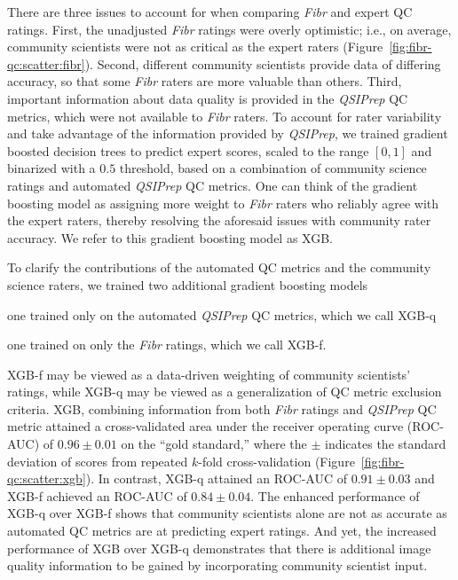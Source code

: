 \documentclass[9pt,lineno]{elife}
\begin{document}
There are three issues to account for when comparing \emph{Fibr} and expert QC ratings. First, the unadjusted \emph{Fibr} ratings were overly optimistic; i.e., on average,
community scientists were not as critical as the expert raters
(Figure~\ref{fig:fibr-qc:scatter:fibr}). Second, different community scientists
provide data of differing accuracy, so that some \emph{Fibr} raters are more valuable than others. Third, important information
about data quality is provided in the \emph{QSIPrep} QC metrics, which were not available to \emph{Fibr} raters. To account for rater
variability and take advantage of the information provided by \emph{QSIPrep},
we trained gradient boosted decision trees \citep{chen2016-eb} to predict expert scores, scaled to the range $[0, 1]$ and
binarized with a $0.5$ threshold,
based on a combination of community science ratings and automated \emph{QSIPrep}
QC metrics. One can think of the gradient boosting model as assigning more weight to \emph{Fibr} raters who reliably agree with the expert raters, thereby resolving the aforesaid issues with community rater accuracy. We refer to this gradient boosting model as XGB.

To clarify the contributions of the automated QC metrics and the community
science raters, we trained two additional gradient boosting models
\begin{enumerate*}[%
    label=(\roman*),%
    before=\unskip{: },%
    itemjoin={{, }},%
    itemjoin*={{ and }}]
    \item one trained only on the automated \emph{QSIPrep} QC metrics, which we
    call XGB-q
    \item one trained on only the \emph{Fibr} ratings, which we call XGB-f.
\end{enumerate*}
XGB-f may be viewed as a data-driven weighting of community scientists' ratings,
while XGB-q may be viewed as a generalization of QC metric exclusion criteria.
XGB, combining information from both \emph{Fibr} ratings and \emph{QSIPrep} QC
metric attained a cross-validated area under the receiver operating curve
(ROC-AUC) of $0.96 \pm 0.01$ on the ``gold standard,'' where the $\pm$ indicates
the standard deviation of scores from repeated $k$-fold cross-validation
(Figure~\ref{fig:fibr-qc:scatter:xgb}). In contrast, XGB-q attained an ROC-AUC of
$0.91 \pm 0.03$ and XGB-f achieved an ROC-AUC of $0.84 \pm 0.04$.
The enhanced
performance of XGB-q over XGB-f shows that community scientists alone are not as
accurate as automated QC metrics are at predicting expert ratings. And yet, the
increased performance of XGB over XGB-q demonstrates that there is additional
image quality information to be gained by incorporating community scientist input.
\end{document}
